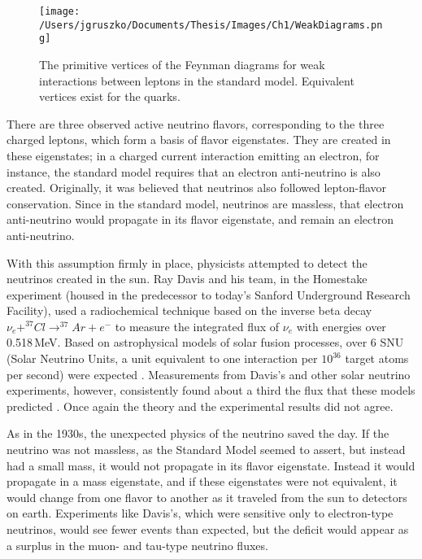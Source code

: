 \begin{figure}[h]
\hfil \texttt{[image: /Users/jgruszko/Documents/Thesis/Images/Ch1/WeakDiagrams.png]} \hfil
\caption{The primitive vertices of the Feynman diagrams for weak interactions between leptons in the standard model. Equivalent vertices exist for the quarks. \cite{PDG2014}}
\label{weak_diagrams}
\end{figure}

There are three observed active neutrino flavors, corresponding to the three charged leptons, which form a basis of flavor eigenstates. They are created in these eigenstates; in a charged current interaction emitting an electron, for instance, the standard model requires that an electron anti-neutrino is also created. Originally, it was believed that neutrinos also followed lepton-flavor conservation. Since in the standard model, neutrinos are massless, that electron anti-neutrino would propagate in its flavor eigenstate, and remain an electron anti-neutrino. 

With this assumption firmly in place, physicists attempted to detect the neutrinos created in the sun. Ray Davis and his team, in the Homestake experiment (housed in the predecessor to today's Sanford Underground Research Facility), used a radiochemical technique based on the inverse beta decay $\nu_{e} + ^{37}Cl \rightarrow ^{37}Ar + e^-$ to measure the integrated flux of $\nu_e$ with energies over 0.518\,MeV. Based on astrophysical models of solar fusion processes, over 6 SNU (Solar Neutrino Units, a unit equivalent to one interaction per $10^{36}$ target atoms per second) were expected \cite{TurckChieze1993} \cite{Bahcall1995}. Measurements from Davis's and other solar neutrino experiments, however, consistently found about a third the flux that these models predicted \cite{Davis1998}. Once again the theory and the experimental results did not agree.

As in the 1930s, the unexpected physics of the neutrino saved the day. If the neutrino was not massless, as the Standard Model seemed to assert, but instead had a small mass, it would not propagate in its flavor eigenstate. Instead it would propagate in a mass eigenstate, and if these eigenstates were not equivalent, it would change from one flavor to another as it traveled from the sun to detectors on earth. Experiments like Davis's, which were sensitive only to electron-type neutrinos, would see fewer events than expected, but the deficit would appear as a surplus in the muon- and tau-type neutrino fluxes. 


